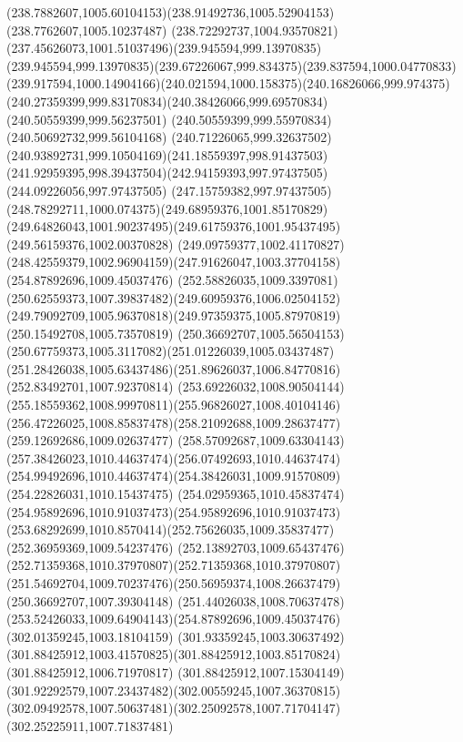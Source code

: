 {{		\curveto(238.7882607,1005.60104153)(238.91492736,1005.52904153)(238.7762607,1005.10237487)
		\curveto(238.72292737,1004.93570821)(237.45626073,1001.51037496)(239.945594,999.13970835)
		\curveto(239.945594,999.13970835)(239.67226067,999.834375)(239.837594,1000.04770833)
		\curveto(239.917594,1000.14904166)(240.021594,1000.158375)(240.16826066,999.974375)
		\curveto(240.27359399,999.83170834)(240.38426066,999.69570834)(240.50559399,999.56237501)
		\lineto(240.50559399,999.55970834)
		\lineto(240.50692732,999.56104168)
		\curveto(240.71226065,999.32637502)(240.93892731,999.10504169)(241.18559397,998.91437503)
		\curveto(241.92959395,998.39437504)(242.94159393,997.97437505)(244.09226056,997.97437505)
		\curveto(247.15759382,997.97437505)(248.78292711,1000.074375)(249.68959376,1001.85170829)
		\curveto(249.64826043,1001.90237495)(249.61759376,1001.95437495)(249.56159376,1002.00370828)
		\curveto(249.09759377,1002.41170827)(248.42559379,1002.96904159)(247.91626047,1003.37704158)
		\moveto(254.87892696,1009.45037476)
		\curveto(252.58826035,1009.3397081)(250.62559373,1007.39837482)(249.60959376,1006.02504152)
		\curveto(249.79092709,1005.96370818)(249.97359375,1005.87970819)(250.15492708,1005.73570819)
		\curveto(250.36692707,1005.56504153)(250.67759373,1005.3117082)(251.01226039,1005.03437487)
		\curveto(251.28426038,1005.63437486)(251.89626037,1006.84770816)(252.83492701,1007.92370814)
		\curveto(253.69226032,1008.90504144)(255.18559362,1008.99970811)(255.96826027,1008.40104146)
		\curveto(256.47226025,1008.85837478)(258.21092688,1009.28637477)(259.12692686,1009.02637477)
		\curveto(258.57092687,1009.63304143)(257.38426023,1010.44637474)(256.07492693,1010.44637474)
		\curveto(254.99492696,1010.44637474)(254.38426031,1009.91570809)(254.22826031,1010.15437475)
		\curveto(254.02959365,1010.45837474)(254.95892696,1010.91037473)(254.95892696,1010.91037473)
		\curveto(253.68292699,1010.8570414)(252.75626035,1009.35837477)(252.36959369,1009.54237476)
		\curveto(252.13892703,1009.65437476)(252.71359368,1010.37970807)(252.71359368,1010.37970807)
		\curveto(251.54692704,1009.70237476)(250.56959374,1008.26637479)(250.36692707,1007.39304148)
		\curveto(251.44026038,1008.70637478)(253.52426033,1009.64904143)(254.87892696,1009.45037476)
		\moveto(302.01359245,1003.18104159)
		\curveto(301.93359245,1003.30637492)(301.88425912,1003.41570825)(301.88425912,1003.85170824)
		\lineto(301.88425912,1006.71970817)
		\curveto(301.88425912,1007.15304149)(301.92292579,1007.23437482)(302.00559245,1007.36370815)
		\curveto(302.09492578,1007.50637481)(302.25092578,1007.71704147)(302.25225911,1007.71837481)
}}
